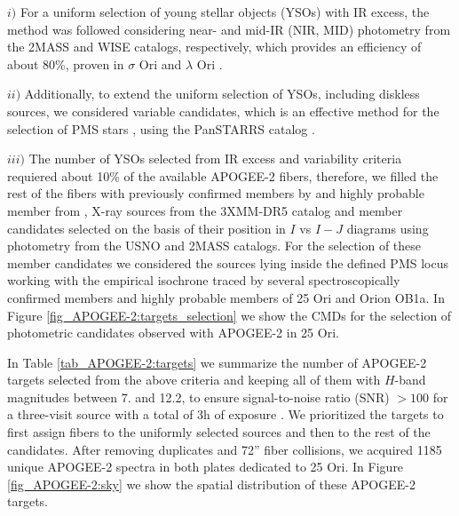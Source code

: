 \documentclass[12pt]{article}
\begin{document}
$i)$ For a uniform selection of young stellar objects (YSOs) with IR excess, the \cite{Koenig2014} method was followed considering near- and mid-IR (NIR, MID) photometry from the 2MASS and WISE \citep{Cutri2013} catalogs, respectively, which provides an efficiency of about 80\%, proven in $\sigma$ Ori and $\lambda$ Ori \citep{Koenig2015}. 

$ii)$ Additionally, to extend the uniform selection of YSOs, including diskless sources, we considered variable candidates, which is an effective method for the selection of PMS stars \citep{Briceno2005,Briceno2018}, using the PanSTARRS catalog \citep{Chambers2016}. 

$iii)$ The number of YSOs selected from IR excess and variability criteria requiered about 10\% of the available APOGEE-2 fibers, therefore, we filled the rest of the fibers with previously confirmed members by \citet{Briceno2005,Briceno2007,Downes2014,Suarez2017} and highly probable member from \citet{Kharchenko2005}, X-ray sources from the 3XMM-DR5 catalog \citep{Rosen2015} and member candidates selected on the basis of their position in $I$ vs $I-J$ diagrams using photometry from the USNO \citep{Monet2003} and 2MASS catalogs. For the selection of these member candidates we considered the sources lying inside the defined PMS locus working with the empirical isochrone traced by several spectroscopically confirmed members and highly probable members of 25 Ori and Orion OB1a. In Figure \ref{fig_APOGEE-2:targets_selection} we show the CMDs for the selection of photometric candidates observed with APOGEE-2 in 25 Ori. 

In Table \ref{tab_APOGEE-2:targets} we summarize the number of APOGEE-2 targets selected from the above criteria and keeping all of them with $H$-band magnitudes between 7. and 12.2, to ensure signal-to-noise ratio (SNR) $>100$ for a three-visit source with a total of 3h of exposure \citep{Majewski2017}. We prioritized the targets to first assign fibers to the uniformly selected sources and then to the rest of the candidates. After removing duplicates and 72'' fiber collisions, we acquired 1185 unique APOGEE-2 spectra in both plates dedicated to 25 Ori. In Figure \ref{fig_APOGEE-2:sky} we show the spatial distribution of these APOGEE-2 targets.
\end{document}
